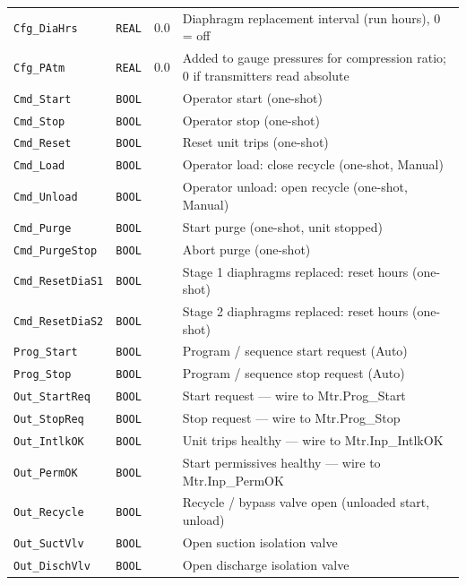 \begin{small}
\begin{longtable}{@{}P{3.70cm}P{2.20cm}P{1.70cm}P{8.91cm}@{}}
\texttt{Cfg\_DiaHrs} & \texttt{REAL} & 0.0 & Diaphragm replacement interval (run hours), 0 = off \\
\texttt{Cfg\_PAtm} & \texttt{REAL} & 0.0 & Added to gauge pressures for compression ratio; 0 if transmitters read absolute \\
\texttt{Cmd\_Start} & \texttt{BOOL} &  & Operator start (one-shot) \\
\texttt{Cmd\_Stop} & \texttt{BOOL} &  & Operator stop (one-shot) \\
\texttt{Cmd\_Reset} & \texttt{BOOL} &  & Reset unit trips (one-shot) \\
\texttt{Cmd\_Load} & \texttt{BOOL} &  & Operator load: close recycle (one-shot, Manual) \\
\texttt{Cmd\_Unload} & \texttt{BOOL} &  & Operator unload: open recycle (one-shot, Manual) \\
\texttt{Cmd\_Purge} & \texttt{BOOL} &  & Start purge (one-shot, unit stopped) \\
\texttt{Cmd\_PurgeStop} & \texttt{BOOL} &  & Abort purge (one-shot) \\
\texttt{Cmd\_ResetDiaS1} & \texttt{BOOL} &  & Stage 1 diaphragms replaced: reset hours (one-shot) \\
\texttt{Cmd\_ResetDiaS2} & \texttt{BOOL} &  & Stage 2 diaphragms replaced: reset hours (one-shot) \\
\texttt{Prog\_Start} & \texttt{BOOL} &  & Program /\allowbreak{} sequence start request (Auto) \\
\texttt{Prog\_Stop} & \texttt{BOOL} &  & Program /\allowbreak{} sequence stop request (Auto) \\
\texttt{Out\_StartReq} & \texttt{BOOL} &  & Start request --- wire to Mtr.Prog\_Start \\
\texttt{Out\_StopReq} & \texttt{BOOL} &  & Stop request --- wire to Mtr.Prog\_Stop \\
\texttt{Out\_IntlkOK} & \texttt{BOOL} &  & Unit trips healthy --- wire to Mtr.Inp\_IntlkOK \\
\texttt{Out\_PermOK} & \texttt{BOOL} &  & Start permissives healthy --- wire to Mtr.Inp\_PermOK \\
\texttt{Out\_Recycle} & \texttt{BOOL} &  & Recycle /\allowbreak{} bypass valve open (unloaded start, unload) \\
\texttt{Out\_SuctVlv} & \texttt{BOOL} &  & Open suction isolation valve \\
\texttt{Out\_DischVlv} & \texttt{BOOL} &  & Open discharge isolation valve \\

\end{longtable}
\end{small}
